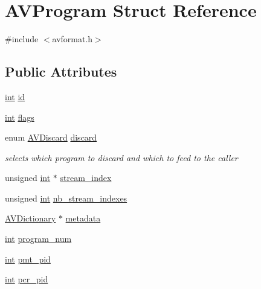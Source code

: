 \hypertarget{struct_a_v_program}{}\section{A\+V\+Program Struct Reference}
\label{struct_a_v_program}


{\ttfamily \#include $<$avformat.\+h$>$}

\subsection*{Public Attributes}
\begin{DoxyCompactItemize}
\item 
\hyperlink{xmltok_8h_a5a0d4a5641ce434f1d23533f2b2e6653}{int} \hyperlink{struct_a_v_program_a10cc799a98b37335e820b0bdb386eb95}{id}
\item 
\hyperlink{xmltok_8h_a5a0d4a5641ce434f1d23533f2b2e6653}{int} \hyperlink{struct_a_v_program_a8c87564167b87f54be9171778d51fe49}{flags}
\item 
enum \hyperlink{group__lavc__decoding_ga352363bce7d3ed82c101b3bc001d1c16}{A\+V\+Discard} \hyperlink{struct_a_v_program_a9c7a07c08a1f960aaa49f3f47633af5c}{discard}
\begin{DoxyCompactList}\small\item\em selects which program to discard and which to feed to the caller \end{DoxyCompactList}\item 
unsigned \hyperlink{xmltok_8h_a5a0d4a5641ce434f1d23533f2b2e6653}{int} $\ast$ \hyperlink{struct_a_v_program_a7967d41af4812ed61a28762e988c7a02}{stream\+\_\+index}
\item 
unsigned \hyperlink{xmltok_8h_a5a0d4a5641ce434f1d23533f2b2e6653}{int} \hyperlink{struct_a_v_program_a136cf29d2aa5b0e4c6d743406c5e39d1}{nb\+\_\+stream\+\_\+indexes}
\item 
\hyperlink{group__lavu__dict_ga1d7cc0833bee918994a600556410315f}{A\+V\+Dictionary} $\ast$ \hyperlink{struct_a_v_program_ae9dab38d4694e3da9cba0f882f4e43d3}{metadata}
\item 
\hyperlink{xmltok_8h_a5a0d4a5641ce434f1d23533f2b2e6653}{int} \hyperlink{struct_a_v_program_a4c1539ea3c98da979b95a59a3ea163cb}{program\+\_\+num}
\item 
\hyperlink{xmltok_8h_a5a0d4a5641ce434f1d23533f2b2e6653}{int} \hyperlink{struct_a_v_program_a02011963a63c291c6dc6d4eefa56cd69}{pmt\+\_\+pid}
\item 
\hyperlink{xmltok_8h_a5a0d4a5641ce434f1d23533f2b2e6653}{int} \hyperlink{struct_a_v_program_a7e026323df87e84a72ec5e5c8ce341a5}{pcr\+\_\+pid}

\end{DoxyCompactItemize}
